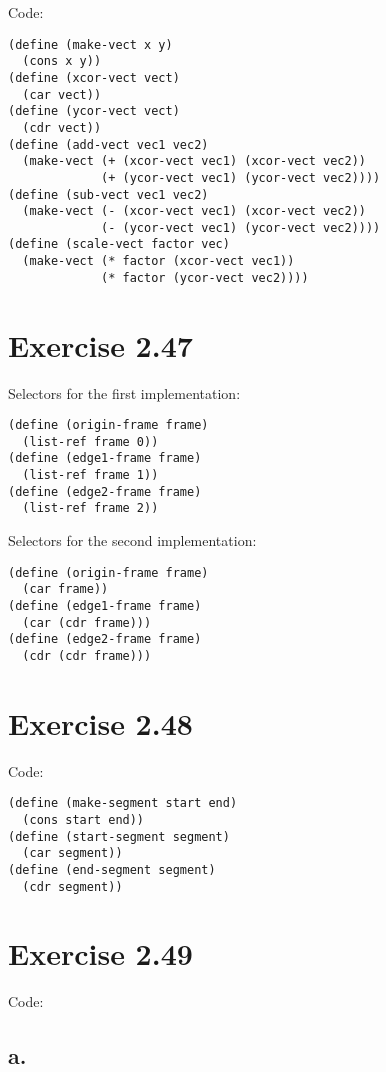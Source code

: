 \documentclass[../main.tex]{subfiles}
\begin{document}
Code:

\begin{lstlisting}
(define (make-vect x y)
  (cons x y))
(define (xcor-vect vect)
  (car vect))
(define (ycor-vect vect)
  (cdr vect))
(define (add-vect vec1 vec2)
  (make-vect (+ (xcor-vect vec1) (xcor-vect vec2))
             (+ (ycor-vect vec1) (ycor-vect vec2))))
(define (sub-vect vec1 vec2)
  (make-vect (- (xcor-vect vec1) (xcor-vect vec2))
             (- (ycor-vect vec1) (ycor-vect vec2))))
(define (scale-vect factor vec)
  (make-vect (* factor (xcor-vect vec1))
             (* factor (ycor-vect vec2))))
\end{lstlisting}

\section{Exercise 2.47}

Selectors for the first implementation:

\begin{lstlisting}
(define (origin-frame frame)
  (list-ref frame 0))
(define (edge1-frame frame)
  (list-ref frame 1))
(define (edge2-frame frame)
  (list-ref frame 2))
\end{lstlisting}

Selectors for the second implementation:

\begin{lstlisting}
(define (origin-frame frame)
  (car frame))
(define (edge1-frame frame)
  (car (cdr frame)))
(define (edge2-frame frame)
  (cdr (cdr frame)))
\end{lstlisting}

\section{Exercise 2.48}

Code:

\begin{lstlisting}
(define (make-segment start end)
  (cons start end))
(define (start-segment segment)
  (car segment))
(define (end-segment segment)
  (cdr segment))
\end{lstlisting}

\section{Exercise 2.49}

Code:

\subsection{a.}
\end{document}
